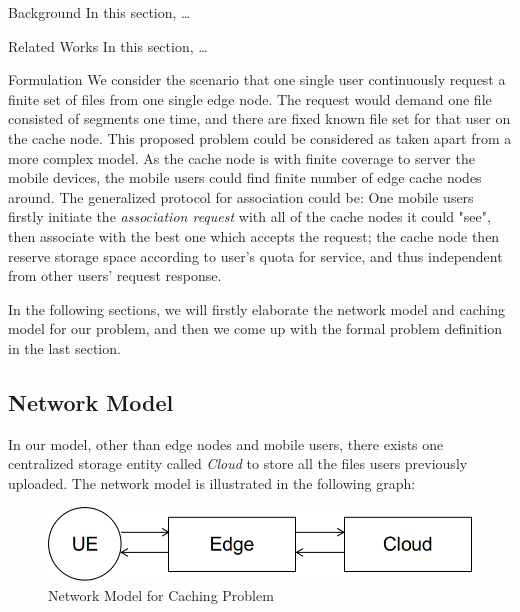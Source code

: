 \documentclass{article}
\begin{document}
\begin{section}{Background}
    \label{background}
    In this section, \dots
\end{section}

\begin{section}{Related Works}
    \label{review}
    In this section, \dots
\end{section}

\begin{section}{Formulation}
    \label{formulation}
    We consider the scenario that one single user continuously request a finite set of files from one single edge node. The request would demand one file consisted of segments one time, and there are fixed known file set for that user on the cache node.
    This proposed problem could be considered as taken apart from a more complex model. As the cache node is with finite coverage to server the mobile devices, the mobile users could find finite number of edge cache nodes around. The generalized protocol for association could be: One mobile users firstly initiate the \textit{association request} with all of the cache nodes it could "see", then associate with the best one which accepts the request; the cache node then reserve storage space according to user's quota for service, and thus independent from other users' request response.
    
    In the following sections, we will firstly elaborate the network model and caching model for our problem, and then we come up with the formal problem definition in the last section.

    \subsection{Network Model}
    In our model, other than edge nodes and mobile users, there exists one centralized storage entity called \emph{Cloud} to store all the files users previously uploaded.
    The network model is illustrated in the following graph:

    \begin{figure}[h!]
        \label{fig:network}
        \centering
        \includegraphics[width=0.8\linewidth]{images/network.png}
        \caption{Network Model for Caching Problem}
    \end{figure}


\end{section}
\end{document}
